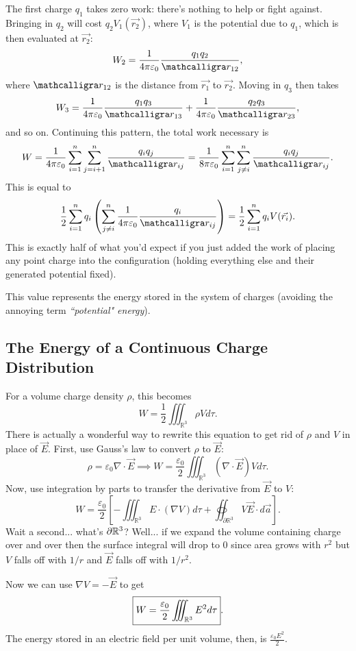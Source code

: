 The first charge $q_1$ takes zero work: there's nothing to help or fight against. Bringing in $q_2$ will cost $q_2V_1(\vec{r_2})$, where $V_1$ is the potential due to $q_1$, which is then evaluated at $\vec{r_2}$:
\[W_2=\frac{1}{4\pi \varepsilon_0}\frac{q_1q_2}{\scr_{12}},\]
where $\scr_{12}$ is the distance from $\vec{r_1}$ to $\vec{r_2}$. Moving in $q_3$ then takes
\[W_3=\frac{1}{4\pi\varepsilon_0}\frac{q_1q_3}{\scr_{13}}+\frac{1}{4\pi\varepsilon_0}\frac{q_2q_3}{\scr_{23}},\]
and so on. Continuing this pattern, the total work necessary is
\[W=\frac{1}{4\pi \varepsilon_0}\sum_{i=1}^n\sum_{j=i+1}^n\frac{q_iq_j}{\scr_{ij}}=\frac{1}{8\pi\varepsilon_0}\sum_{i=1}^n\sum_{j\neq i}^n\frac{q_iq_j}{\scr_{ij}}.\]
This is equal to
\begin{equation}\label{pointchargeenergy}
\frac{1}{2}\sum_{i=1}^nq_i\left(\sum_{j\neq i}^n\frac{1}{4\pi\varepsilon_0}\frac{q_i}{\scr_{ij}}\right)=\frac{1}{2}\sum_{i=1}^nq_iV(\vec{r_i}).
\end{equation}
This is exactly half of what you'd expect if you just added the work of placing any point charge into the configuration (holding everything else and their generated potential fixed).

This value represents the energy stored in the system of charges (avoiding the annoying term \textit{``potential" energy}).

\subsection{The Energy of a Continuous Charge Distribution}

For a volume charge density $\rho$, this becomes
\[W=\frac{1}{2}\iiint_{\mathbb{R}^3}\rho Vd\tau.\]
There is actually a wonderful way to rewrite this equation to get rid of $\rho$ and $V$ in place of $\vec{E}$. First, use Gauss's law to convert $\rho$ to $\vec{E}$:
\[\rho=\varepsilon_0
\nabla\cdot \vec{E}\implies W=\frac{\varepsilon_0}{2}\iiint_{\mathbb{R}^3}(\nabla\cdot \vec{E})Vd\tau.\]
Now, use integration by parts to transfer the derivative from $\vec{E}$ to $V$:
\[W=\frac{\varepsilon_0}{2}\left[-\iiint_{\mathbb{R}^3}E\cdot(\nabla V)d\tau+\oiint_{\partial \mathbb{R}^3}V\vec{E}\cdot d\vec{a}\right].\]
Wait a second... what's $\partial \mathbb R^3$? Well... if we expand the volume containing charge over and over then the surface integral will drop to $0$ since area grows with $r^2$ but $V$ falls off with $1/r$ and $\vec{E}$ falls off with $1/r^2$.

Now we can use $\nabla V=-\vec{E}$ to get
\begin{equation}\label{energyelectric}
\boxed{W=\frac{\varepsilon_0}{2}\iiint_{\mathbb R^3}E^2d\tau}.
\end{equation}
The energy stored in an electric field per unit volume, then, is $\frac{\varepsilon_0E^2}{2}$.

